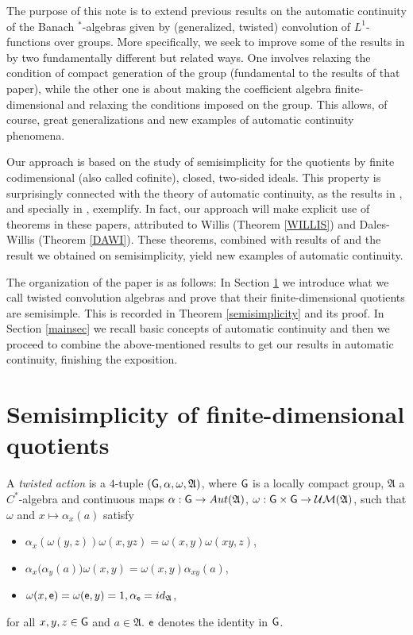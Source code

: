 \documentclass[11pt]{article}
\newcommand{\A}{\mathfrak{A}}
\def\e{{\sf e}}
\def\G{{\sf G}}
\theoremstyle{definition}
\theoremstyle{remark}
\numberwithin{equation}{section}
\numberwithin{equation}{section}
\begin{document}
The purpose of this note is to extend previous results on the automatic continuity of the Banach $^*$-algebras given by (generalized, twisted) convolution of $L^1$-functions over groups. More specifically, we seek to improve some of the results in \cite{flores2024} by two fundamentally different but related ways. One involves relaxing the condition of compact generation of the group (fundamental to the results of that paper), while the other one is about making the coefficient algebra finite-dimensional and relaxing the conditions imposed on the group. This allows, of course, great generalizations and new examples of automatic continuity phenomena.

Our approach is based on the study of semisimplicity for the quotients by finite codimensional (also called cofinite), closed, two-sided ideals. This property is surprisingly connected with the theory of automatic continuity, as the results in \cite{Ru96}, and specially in \cite{DaWi83}, exemplify. In fact, our approach will make explicit use of theorems in these papers, attributed to Willis (Theorem \ref{WILLIS}) and Dales-Willis (Theorem \ref{DAWI}). These theorems, combined with results of \cite{flores2024} and the result we obtained on semisimplicity, yield new examples of automatic continuity.

The organization of the paper is as follows: In Section \ref{semis} we introduce what we call twisted convolution algebras and prove that their finite-dimensional quotients are semisimple. This is recorded in Theorem \ref{semisimplicity} and its proof. In Section \ref{mainsec} we recall basic concepts of automatic continuity and then we proceed to combine the above-mentioned results to get our results in automatic continuity, finishing the exposition.




\section{Semisimplicity of finite-dimensional quotients}\label{semis}

A {\it twisted action} is a $4$-tuple $(\G,\alpha,\omega,\A)$, where $\G$ is a locally compact group, $\A$ a $C^*$-algebra and continuous maps $\alpha:\G\to{\rm Aut}({\A})$, $\omega:\G\times\G\to \mathcal{UM}({\A})$, such that $\omega$ and $x\mapsto\alpha_x(a)$ satisfy \begin{itemize}
        \item[(i)] $\alpha_x(\omega(y,z))\omega(x,yz)=\omega(x,y)\omega(xy,z)$,
        \item[(ii)] $\alpha_x\big(\alpha_y(a)\big)\omega(x,y)=\omega(x,y)\alpha_{xy}(a)$,
        \item[(iii)] $\omega(x,\e)=\omega(\e,y)=1, \alpha_\e={\rm id}_{{\A}}$,
    \end{itemize} for all $x,y,z\in\G$ and $a\in\A$. $\e$ denotes the identity in $\G$.
\end{document}
